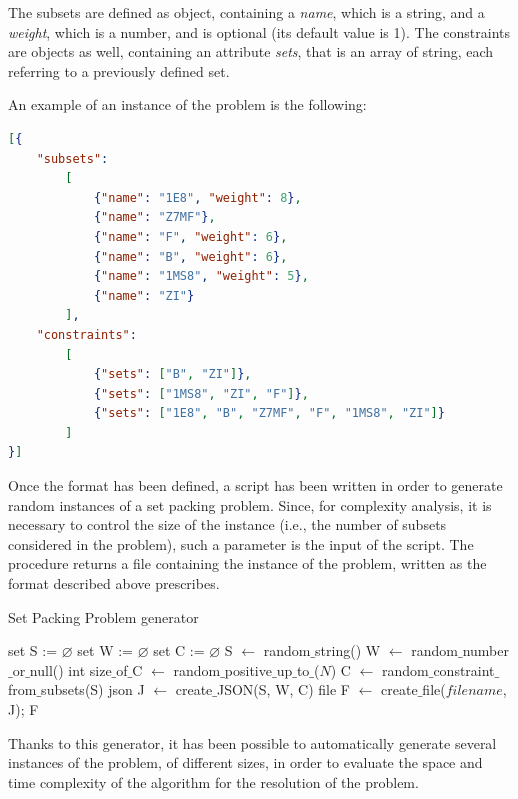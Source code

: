 \documentclass[oneside,a4paper]{article}
\begin{document}
The subsets are defined as object, containing a \textit{name}, which is a string, and a \textit{weight}, which is a number, and is optional (its default value is 1). The constraints are objects as well, containing an attribute \textit{sets}, that is an array of string, each referring to a previously defined set.

An example of an instance of the problem is the following: 

\begin{lstlisting}[language=json,firstnumber=1]
[{
    "subsets": 
        [
            {"name": "1E8", "weight": 8},
            {"name": "Z7MF"},
            {"name": "F", "weight": 6},
            {"name": "B", "weight": 6},
            {"name": "1MS8", "weight": 5},
            {"name": "ZI"}
        ],
    "constraints":
        [
            {"sets": ["B", "ZI"]},
            {"sets": ["1MS8", "ZI", "F"]},
            {"sets": ["1E8", "B", "Z7MF", "F", "1MS8", "ZI"]}
        ]
}]
\end{lstlisting}

Once the format has been defined, a script has been written in order to generate random instances of a set packing problem. Since, for complexity analysis, it is necessary to control the size of the instance (i.e., the number of subsets considered in the problem), such a parameter is the input of the script. The procedure returns a file containing the instance of the problem, written as the format described above prescribes.

\begin{algorithm}
\caption{Set Packing Problem generator}
\begin{algorithmic}[1]


    \State set S := $\varnothing$  
    \State set W := $\varnothing$  
    \State set C := $\varnothing$  
        \State S $\leftarrow$ random$\_$string()   
        \State W $\leftarrow$ random$\_$number$\_$or$\_$null()  
    \EndWhile  \label{loop}
    \State int size$\_$of$\_$C $\leftarrow$ random$\_$positive$\_$up$\_$to$\_$($N$)  
        \State C $\leftarrow$ random$\_$constraint$\_$from$\_$subsets(S) 
    \EndWhile  \label{loop1}
    \State json J $\leftarrow$ create$\_$JSON(S, W, C)   
    \State file F $\leftarrow$ create$\_$file($filename$, J);  
    \State \Return F  
\EndProcedure

\end{algorithmic}
\end{algorithm}
Thanks to this generator, it has been possible to automatically generate several instances of the problem, of different sizes, in order to evaluate the space and time complexity of the algorithm for the resolution of the problem. 
\end{document}
